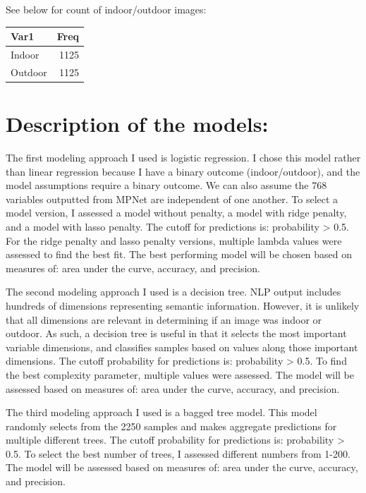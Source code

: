 \documentclass[
  english,
  man]{apa6}
\begin{document}
See below for count of indoor/outdoor images:

\begin{tabular}{l|r}
\hline
Var1 & Freq\\
\hline
Indoor & 1125\\
\hline
Outdoor & 1125\\
\hline
\end{tabular}

\hypertarget{description-of-the-models}{%
\section{Description of the models:}\label{description-of-the-models}}

The first modeling approach I used is logistic regression. I chose this model rather than linear regression because I have a binary outcome (indoor/outdoor), and the model assumptions require a binary outcome. We can also assume the 768 variables outputted from MPNet are independent of one another. To select a model version, I assessed a model without penalty, a model with ridge penalty, and a model with lasso penalty. The cutoff for predictions is: probability \textgreater{} 0.5. For the ridge penalty and lasso penalty versions, multiple lambda values were assessed to find the best fit. The best performing model will be chosen based on measures of: area under the curve, accuracy, and precision.

The second modeling approach I used is a decision tree. NLP output includes hundreds of dimensions representing semantic information. However, it is unlikely that all dimensions are relevant in determining if an image was indoor or outdoor. As such, a decision tree is useful in that it selects the most important variable dimensions, and classifies samples based on values along those important dimensions. The cutoff probability for predictions is: probability \textgreater{} 0.5. To find the best complexity parameter, multiple values were assessed. The model will be assessed based on measures of: area under the curve, accuracy, and precision.

The third modeling approach I used is a bagged tree model. This model randomly selects from the 2250 samples and makes aggregate predictions for multiple different trees. The cutoff probability for predictions is: probability \textgreater{} 0.5. To select the best number of trees, I assessed different numbers from 1-200. The model will be assessed based on measures of: area under the curve, accuracy, and precision.
\end{document}
